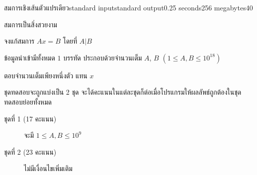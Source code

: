 \documentclass[11pt,a4paper]{article}
\begin{document}
\begin{problem}{สมการเชิงเส้นตัวแปรเดียว}{standard input}{standard output}{0.25 seconds}{256 megabytes}{40}

สมการเป็นสิ่งสวยงาม

จงแก้สมการ $Ax=B$ โดยที่ $A|B$

\InputFile
ข้อมูลนำเข้ามีทั้งหมด $1$ บรรทัด
ประกอบด้วยจำนวนเต็ม $A$, $B$ $(1 \leq A, B \leq 10^{18})$

\OutputFile
ตอบจำนวนเต็มเพียงหนึ่งตัว แทน $x$

\Scoring
ชุดทดสอบจะถูกแบ่งเป็น 2 ชุด จะได้คะแนนในแต่ละชุดก็ต่อเมื่อโปรแกรมให้ผลลัพธ์ถูกต้องในชุดทดสอบย่อยทั้งหมด

\begin{description}

\item[ชุดที่ 1 (17 คะแนน)] จะมี $ 1 \leq A, B \leq 10^9$

\item[ชุดที่ 2 (23 คะแนน)] ไม่มีเงื่อนไขเพิ่มเติม 

\end{description}

\Examples

\begin{example}
%
%
\end{example}

\end{problem}
\end{document}
